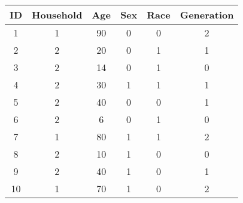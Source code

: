 \begin{tabular}{cccccc}
ID & Household & Age & Sex & Race & Generation \\
\hline
\hline
1 & 1 & 90 & 0 & 0 & 2  \\
\hline
2 & 2 & 20 & 0 & 1 & 1  \\
\hline
3 & 2 & 14 & 0 & 1 & 0  \\
\hline
4 & 2 & 30 & 1 & 1 & 1  \\
\hline
5 & 2 & 40 & 0 & 0 & 1  \\
\hline
6 & 2 & 6 & 0 & 1 & 0  \\
\hline
7 & 1 & 80 & 1 & 1 & 2  \\
\hline
8 & 2 & 10 & 1 & 0 & 0  \\
\hline
9 & 2 & 40 & 1 & 0 & 1  \\
\hline
10 & 1 & 70 & 1 & 0 & 2  \\
\hline
\end{tabular}
